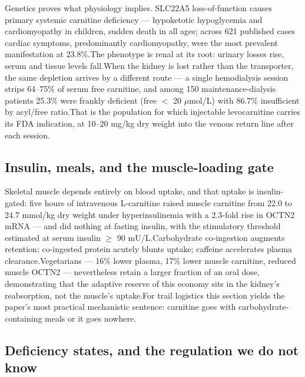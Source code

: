 \documentclass[11pt]{article}
\newcommand{\src}[1]{\allowbreak[#1]}
\begin{document}
Genetics proves what physiology implies. SLC22A5 loss-of-function causes primary systemic carnitine deficiency --- hypoketotic hypoglycemia and cardiomyopathy in children, sudden death in all ages; across 621 published cases cardiac symptoms, predominantly cardiomyopathy, were the most prevalent manifestation at 23.8\%.\src{104}\src{109}\src{108} The phenotype is renal at its root: urinary losses rise, serum and tissue levels fall.\src{86} When the kidney is lost rather than the transporter, the same depletion arrives by a different route --- a single hemodialysis session strips 64--75\% of serum free carnitine, and among 150 maintenance-dialysis patients 25.3\% were frankly deficient (free $<$ 20 $\mu$mol/L) with 86.7\% insufficient by acyl/free ratio.\src{94} That is the population for which injectable levocarnitine carries its FDA indication, at 10--20 mg/kg dry weight into the venous return line after each session.\src{66}

\subsection{Insulin, meals, and the muscle-loading gate}

Skeletal muscle depends entirely on blood uptake, and that uptake is insulin-gated: five hours of intravenous L-carnitine raised muscle carnitine from 22.0 to 24.7 mmol/kg dry weight under hyperinsulinemia with a 2.3-fold rise in OCTN2 mRNA --- and did nothing at fasting insulin, with the stimulatory threshold estimated at serum insulin $\geq$ 90 mU/L.\src{98}\src{139} Carbohydrate co-ingestion augments retention; co-ingested protein acutely blunts uptake; caffeine accelerates plasma clearance.\src{138}\src{114}\src{85} Vegetarians --- 16\% lower plasma, 17\% lower muscle carnitine, reduced muscle OCTN2 --- nevertheless retain a larger fraction of an oral dose, demonstrating that the adaptive reserve of this economy sits in the kidney's reabsorption, not the muscle's uptake.\src{126} For trail logistics this section yields the paper's most practical mechanistic sentence: carnitine goes with carbohydrate-containing meals or it goes nowhere.\src{138}\src{98}

\subsection{Deficiency states, and the regulation we do not know}
\end{document}
